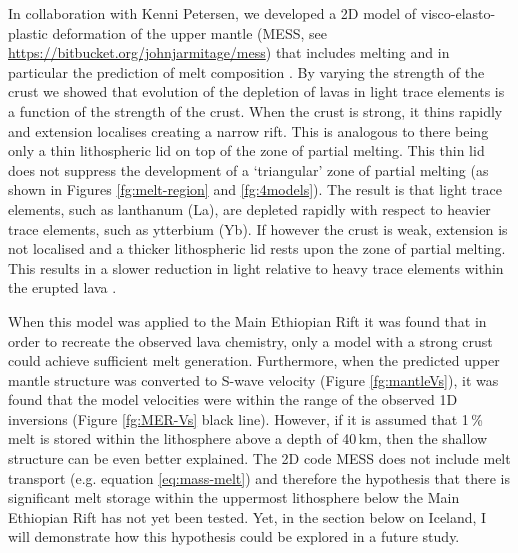 In collaboration with Kenni Petersen, we developed a 2D model of visco-elasto-plastic deformation of the upper mantle (MESS, see \url{https://bitbucket.org/johnjarmitage/mess}) that includes melting and in particular the prediction of melt composition \citep{petersen-etal-2015,armitage-etal-g3-2018}. By varying the strength of the crust we showed that evolution of the depletion of lavas in light trace elements is a function of the strength of the crust. When the crust is strong, it thins rapidly and extension localises creating a narrow rift. This is analogous to there being only a thin lithospheric lid on top of the zone of partial melting. This thin lid does not suppress the development of a `triangular' zone of partial melting (as shown in Figures \ref{fg:melt-region} and \ref{fg:4models}). The result is that light trace elements, such as lanthanum (La), are depleted rapidly with respect to heavier trace elements, such as ytterbium (Yb). If however the crust is weak, extension is not localised and a thicker lithospheric lid rests upon the zone of partial melting. This results in a slower reduction in light relative to heavy trace elements within the erupted lava \citep{armitage-etal-g3-2018}.

When this model was applied to the Main Ethiopian Rift it was found that in order to recreate the observed lava chemistry, only a model with a strong crust could achieve sufficient melt generation. Furthermore, when the predicted upper mantle structure was converted to S-wave velocity (Figure \ref{fg:mantleVs}), it was found that the model velocities were within the range of the observed 1D inversions (Figure \ref{fg:MER-Vs} black line). However, if it is assumed that 1\,\% melt is stored within the lithosphere above a depth of 40\,km, then the shallow structure can be even better explained. The 2D code MESS does not include melt transport (e.g. equation \ref{eq:mass-melt}) and therefore the hypothesis that there is significant melt storage within the uppermost lithosphere below the Main Ethiopian Rift has not yet been tested. Yet, in the section below on Iceland, I will demonstrate how this hypothesis could be explored in a future study.

